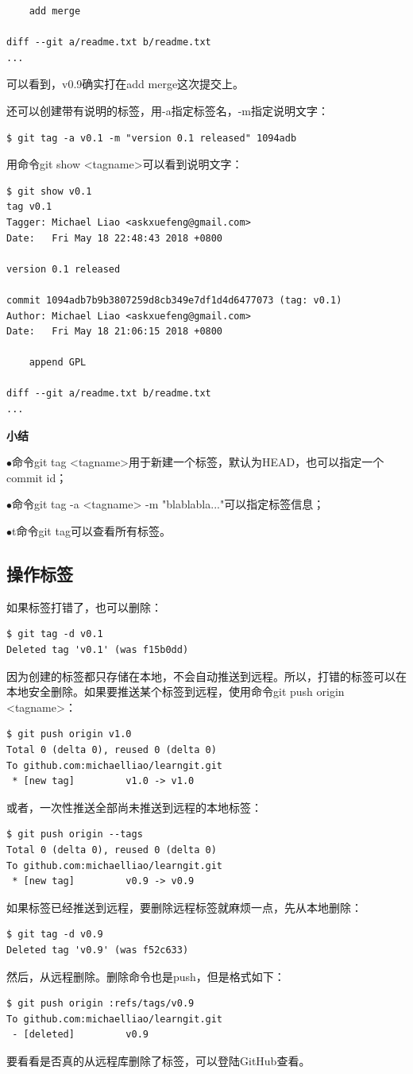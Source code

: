 \documentclass[•]{article}
\begin{document}
\begin{CJK}{UTF8}{gbsn}
\begin{lstlisting}
    add merge

diff --git a/readme.txt b/readme.txt
...
\end{lstlisting}
可以看到，v0.9确实打在add merge这次提交上。

还可以创建带有说明的标签，用-a指定标签名，-m指定说明文字：
\begin{lstlisting}
$ git tag -a v0.1 -m "version 0.1 released" 1094adb
\end{lstlisting}
用命令git show <tagname>可以看到说明文字：
\begin{lstlisting}
$ git show v0.1
tag v0.1
Tagger: Michael Liao <askxuefeng@gmail.com>
Date:   Fri May 18 22:48:43 2018 +0800

version 0.1 released

commit 1094adb7b9b3807259d8cb349e7df1d4d6477073 (tag: v0.1)
Author: Michael Liao <askxuefeng@gmail.com>
Date:   Fri May 18 21:06:15 2018 +0800

    append GPL

diff --git a/readme.txt b/readme.txt
...
\end{lstlisting}

\textbf{小结}

 $   \bullet$命令git tag <tagname>用于新建一个标签，默认为HEAD，也可以指定一个commit id；

 $   \bullet $命令git tag -a <tagname> -m "blablabla..."可以指定标签信息；

$   \bullet$t命令git tag可以查看所有标签。


\subsection{操作标签}

如果标签打错了，也可以删除：
\begin{lstlisting}
$ git tag -d v0.1
Deleted tag 'v0.1' (was f15b0dd)
\end{lstlisting}
因为创建的标签都只存储在本地，不会自动推送到远程。所以，打错的标签可以在本地安全删除。如果要推送某个标签到远程，使用命令git push origin <tagname>：
\begin{lstlisting}
$ git push origin v1.0
Total 0 (delta 0), reused 0 (delta 0)
To github.com:michaelliao/learngit.git
 * [new tag]         v1.0 -> v1.0
\end{lstlisting}
或者，一次性推送全部尚未推送到远程的本地标签：
\begin{lstlisting}
$ git push origin --tags
Total 0 (delta 0), reused 0 (delta 0)
To github.com:michaelliao/learngit.git
 * [new tag]         v0.9 -> v0.9
\end{lstlisting}
如果标签已经推送到远程，要删除远程标签就麻烦一点，先从本地删除：
\begin{lstlisting}
$ git tag -d v0.9
Deleted tag 'v0.9' (was f52c633)
\end{lstlisting}
然后，从远程删除。删除命令也是push，但是格式如下：
\begin{lstlisting}
$ git push origin :refs/tags/v0.9
To github.com:michaelliao/learngit.git
 - [deleted]         v0.9
\end{lstlisting}
要看看是否真的从远程库删除了标签，可以登陆GitHub查看。


\end{CJK}
\end{document}

